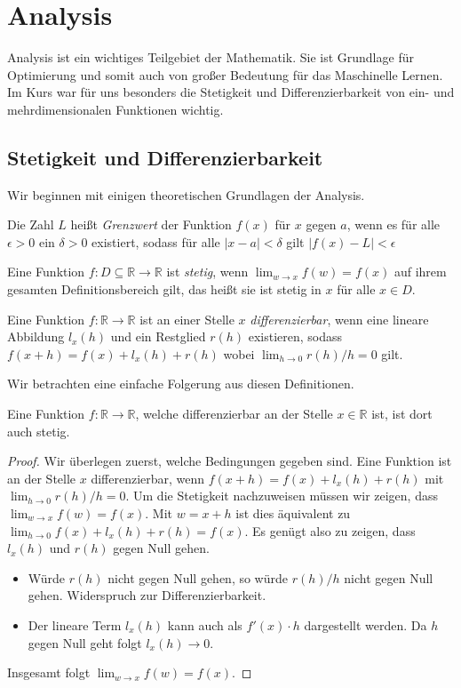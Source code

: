 \section{Analysis}

Analysis ist ein wichtiges Teilgebiet der Mathematik. Sie ist Grundlage für Optimierung und somit auch von großer Bedeutung für das Maschinelle Lernen. Im Kurs war für uns besonders die Stetigkeit und Differenzierbarkeit von ein- und mehrdimensionalen Funktionen wichtig.

\subsection{Stetigkeit und Differenzierbarkeit}

Wir beginnen mit einigen theoretischen Grundlagen der Analysis.
\begin{Def} Die Zahl $L$ heißt \emph{Grenzwert} der Funktion $f(x)$ für $x$ gegen $a$, wenn es für alle $\epsilon > 0$ ein $\delta > 0$ existiert, sodass für alle $|x-a| < \delta$ gilt $|f(x)-L|<\epsilon$
\end{Def}
\begin{Def}
Eine Funktion $f: D \subseteq \mathbb{R}\rightarrow \mathbb{R}$ ist \emph{stetig}, wenn $\lim_{w\rightarrow x}f(w)=f(x)$ auf ihrem gesamten Definitionsbereich gilt, das heißt sie ist stetig in $x$ für alle $x\in D$.
\end{Def}
\begin{Def}
Eine Funktion $f:\mathbb{R}\rightarrow \mathbb{R}$ ist an einer Stelle $x$ \emph{differenzierbar}, wenn eine lineare Abbildung $ l_ x (h)$ und ein Restglied $r(h)$ existieren, sodass $f(x+h)=f(x)+l_{x}(h)+r(h)$ wobei $\lim_{h\rightarrow 0} r(h)/h= 0$ gilt.
\end{Def}
Wir betrachten eine einfache Folgerung aus diesen Definitionen.


\begin{lemma}
Eine Funktion $f:\mathbb{R} \rightarrow \mathbb{R}$, welche differenzierbar an der Stelle $x \in \mathbb{R}$ ist, ist dort auch stetig.
\end{lemma}

\begin{proof}
Wir überlegen zuerst, welche Bedingungen gegeben sind. Eine Funktion ist an der Stelle $x$ differenzierbar, wenn $f(x+h)=f(x)+l_x(h)+ r(h)$  mit $\lim_{h \rightarrow 0} r(h)/h= 0$. Um die Stetigkeit nachzuweisen müssen wir zeigen, dass $\lim_{w \rightarrow x} f(w)=f(x)$. Mit $w = x+h$ ist dies äquivalent zu $\lim_{h \rightarrow 0} f(x)+l_x(h)+r(h)=f(x)$. Es genügt also zu zeigen, dass  $l_x(h)$ und $r(h)$ gegen Null gehen.
\begin{itemize}
  \item Würde $r(h)$ nicht gegen Null gehen, so würde $r(h)/h$ nicht gegen Null gehen. Widerspruch zur Differenzierbarkeit.
  \item Der lineare Term $l_x(h)$ kann auch als $f'(x) \cdot h$ dargestellt werden. Da $h$ gegen Null geht folgt $l_x(h)\rightarrow 0$.
\end{itemize}
Insgesamt folgt $\lim_{w\rightarrow x} f(w) = f(x)$.
\end{proof}

